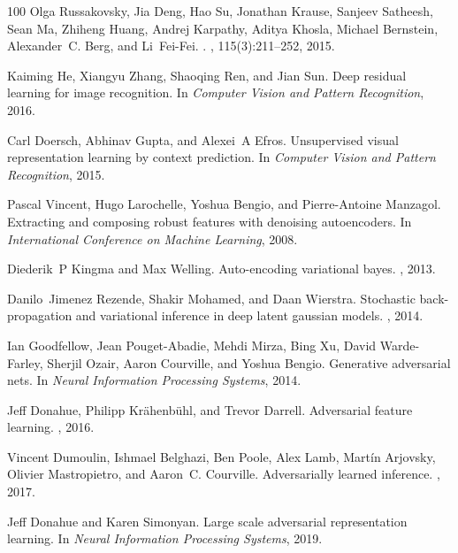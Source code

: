 \documentclass{article}
\begin{document}
{\begin{thebibliography}{100}
Olga Russakovsky, Jia Deng, Hao Su, Jonathan Krause, Sanjeev Satheesh, Sean Ma,
  Zhiheng Huang, Andrej Karpathy, Aditya Khosla, Michael Bernstein,
  Alexander~C. Berg, and Li~Fei-Fei.
.
, 115(3):211--252,
  2015.

Kaiming He, Xiangyu Zhang, Shaoqing Ren, and Jian Sun.
\newblock Deep residual learning for image recognition.
\newblock In {\em Computer Vision and Pattern Recognition}, 2016.

Carl Doersch, Abhinav Gupta, and Alexei~A Efros.
\newblock Unsupervised visual representation learning by context prediction.
\newblock In {\em Computer Vision and Pattern Recognition}, 2015.

Pascal Vincent, Hugo Larochelle, Yoshua Bengio, and Pierre-Antoine Manzagol.
\newblock Extracting and composing robust features with denoising autoencoders.
\newblock In {\em International Conference on Machine Learning}, 2008.

Diederik~P Kingma and Max Welling.
\newblock Auto-encoding variational bayes.
, 2013.

Danilo~Jimenez Rezende, Shakir Mohamed, and Daan Wierstra.
\newblock Stochastic back-propagation and variational inference in deep latent
  gaussian models.
, 2014.

Ian Goodfellow, Jean Pouget-Abadie, Mehdi Mirza, Bing Xu, David Warde-Farley,
  Sherjil Ozair, Aaron Courville, and Yoshua Bengio.
\newblock Generative adversarial nets.
\newblock In {\em Neural Information Processing Systems}, 2014.

Jeff Donahue, Philipp Kr{\"a}henb{\"u}hl, and Trevor Darrell.
\newblock Adversarial feature learning.
, 2016.

Vincent Dumoulin, Ishmael Belghazi, Ben Poole, Alex Lamb, Mart{\'i}n Arjovsky,
  Olivier Mastropietro, and Aaron~C. Courville.
\newblock Adversarially learned inference.
, 2017.

Jeff Donahue and Karen Simonyan.
\newblock Large scale adversarial representation learning.
\newblock In {\em Neural Information Processing Systems}, 2019.


\end{thebibliography}}
\end{document}
